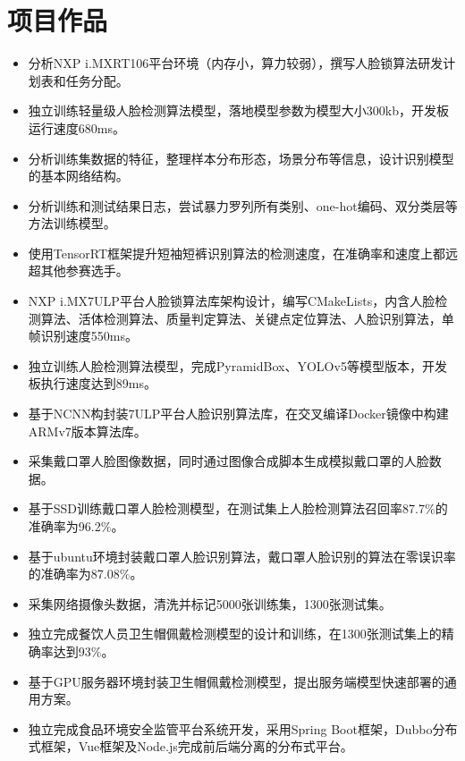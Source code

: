 \documentclass{resume}
\begin{document}
\section{项目作品}
\begin{itemize}
  \item 分析NXP i.MXRT106平台环境（内存小，算力较弱），撰写人脸锁算法研发计划表和任务分配。
  \item 独立训练轻量级人脸检测算法模型，落地模型参数为模型大小300kb，开发板运行速度680ms。
\end{itemize}
\begin{itemize}
  \item 分析训练集数据的特征，整理样本分布形态，场景分布等信息，设计识别模型的基本网络结构。
  \item 分析训练和测试结果日志，尝试暴力罗列所有类别、one-hot编码、双分类层等方法训练模型。
  \item 使用TensorRT框架提升短袖短裤识别算法的检测速度，在准确率和速度上都远超其他参赛选手。
\end{itemize}
\begin{itemize}
  \item NXP i.MX7ULP平台人脸锁算法库架构设计，编写CMakeLists，内含人脸检测算法、活体检测算法、质量判定算法、关键点定位算法、人脸识别算法，单帧识别速度550ms。
  \item 独立训练人脸检测算法模型，完成PyramidBox、YOLOv5等模型版本，开发板执行速度达到89ms。
  \item 基于NCNN构封装7ULP平台人脸识别算法库，在交叉编译Docker镜像中构建ARMv7版本算法库。
\end{itemize}
\begin{itemize}
  \item 采集戴口罩人脸图像数据，同时通过图像合成脚本生成模拟戴口罩的人脸数据。
  \item 基于SSD训练戴口罩人脸检测模型，在测试集上人脸检测算法召回率87.7$\%$的准确率为96.2$\%$。
  \item 基于ubuntu环境封装戴口罩人脸识别算法，戴口罩人脸识别的算法在零误识率的准确率为87.08$\%$。
\end{itemize}
\begin{itemize}
  \item 采集网络摄像头数据，清洗并标记5000张训练集，1300张测试集。
  \item 独立完成餐饮人员卫生帽佩戴检测模型的设计和训练，在1300张测试集上的精确率达到93$\%$。
  \item 基于GPU服务器环境封装卫生帽佩戴检测模型，提出服务端模型快速部署的通用方案。
  \item 独立完成食品环境安全监管平台系统开发，采用Spring Boot框架，Dubbo分布式框架，Vue框架及Node.js完成前后端分离的分布式平台。
\end{itemize}
\end{document}
